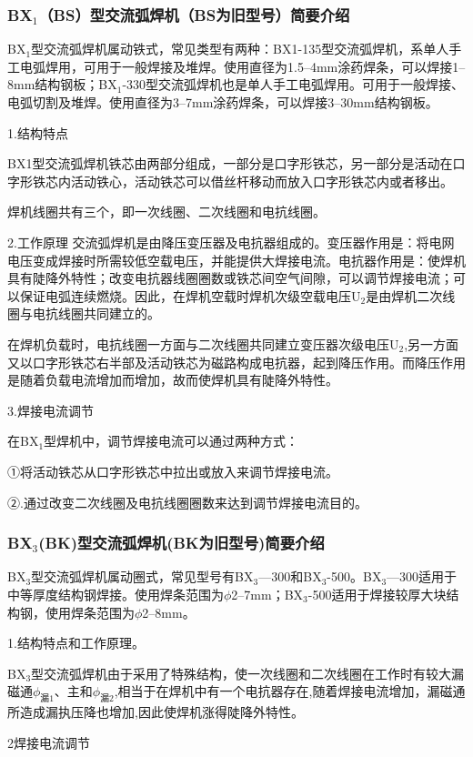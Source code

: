 \documentclass{ctexbook}
\begin{document}
\subsubsection{BX$_1$（BS）型交流弧焊机（BS为旧型号）简要介绍}
BX$_1$型交流弧焊机属动铁式，常见类型有两种：BX1-135型交流弧焊机，系单人手工电弧焊用，可用于一般焊接及堆焊。使用直径为1.5--4mm涂药焊条，可以焊接1--8mm结构钢板；BX$_1$-330型交流弧焊机也是单人手工电弧焊用。可用于一般焊接、电弧切割及堆焊。使用直径为3--7mm涂药焊条，可以焊接3--30mm结构钢板。

1.结构特点

BX1型交流弧焊机铁芯由两部分组成，一部分是口字形铁芯，另一部分是活动在口字形铁芯内活动铁心，活动铁芯可以借丝杆移动而放入口字形铁芯内或者移出。

焊机线圈共有三个，即一次线圈、二次线圈和电抗线圈。

2.工作原理
交流弧焊机是由降压变压器及电抗器组成的。变压器作用是：将电网电压变成焊接时所需较低空载电压，并能提供大焊接电流。电抗器作用是：使焊机具有陡降外特性；改变电抗器线圈圈数或铁芯间空气间隙，可以调节焊接电流；可以保证电弧连续燃烧。因此，在焊机空载时焊机次级空载电压U$_2$是由焊机二次线圈与电抗线圈共同建立的。

在焊机负载时，电抗线圈一方面与二次线圈共同建立变压器次级电压U$_2$,另一方面又以口字形铁芯右半部及活动铁芯为磁路构成电抗器，起到降压作用。而降压作用是随着负载电流增加而增加，故而使焊机具有陡降外特性。

3.焊接电流调节

在BX$_1$型焊机中，调节焊接电流可以通过两种方式：

①将活动铁芯从口字形铁芯中拉出或放入来调节焊接电流。

②.通过改变二次线圈及电抗线圈圈数来达到调节焊接电流目的。
\subsubsection{BX$_3$(BK)型交流弧焊机(BK为旧型号)简要介绍}
BX$_3$型交流弧焊机属动圈式，常见型号有BX$_3$—300和BX$_3$-500。BX$_3$—300适用于中等厚度结构钢焊接。使用焊条范围为$\phi$2--7mm；BX$_3$-500适用于焊接较厚大块结构钢，使用焊条范围为$\phi$2--8mm。

1.结构特点和工作原理。

BX$_3$型交流弧焊机由于采用了特殊结构，使一次线圈和二次线圈在工作时有较大漏磁通$\phi_{\text{漏}1}$、主和$\phi_{\text{漏}2}$,相当于在焊机中有一个电抗器存在,随着焊接电流增加，漏磁通所造成漏执压降也增加,因此使焊机涨得陡降外特性。

2焊接电流调节
\end{document}
